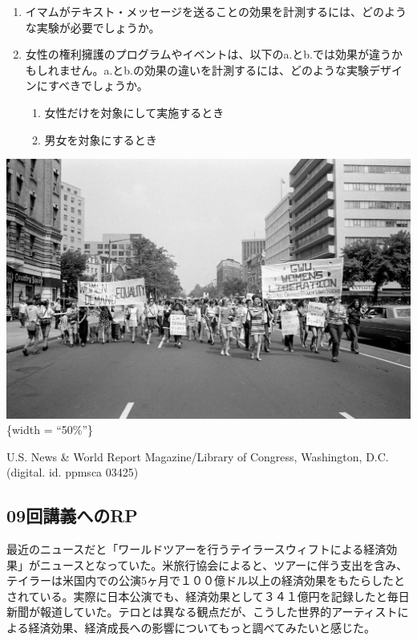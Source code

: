 \documentclass[
  letterpaper,
  DIV=11,
  numbers=noendperiod,
  oneside]{scrartcl}
\providecommand{\tightlist}{%
  \setlength{\itemsep}{0pt}\setlength{\parskip}{0pt}}\usepackage{longtable,booktabs,array}
\begin{document}
\begin{enumerate}
\def\labelenumi{\arabic{enumi}.}
\tightlist
\item
  イマムがテキスト・メッセージを送ることの効果を計測するには、どのような実験が必要でしょうか。
\item
  女性の権利擁護のプログラムやイベントは、以下のa.とb.では効果が違うかもしれません。a.とb.の効果の違いを計測するには、どのような実験デザインにすべきでしょうか。

  \begin{enumerate}
  \def\labelenumii{\alph{enumii}.}
  \tightlist
  \item
    女性だけを対象にして実施するとき
  \item
    男女を対象にするとき
  \end{enumerate}
\end{enumerate}

\includegraphics{DC1970.jpg}\{width = ``50\%''\}

U.S. News \& World Report Magazine/Library of Congress, Washington, D.C.
(digital. id. ppmsca 03425)

\subsection{09回講義へのRP}\label{ux56deux8b1bux7fa9ux3078ux306erp}

\begin{tcolorbox}[enhanced jigsaw, bottomrule=.15mm, leftrule=.75mm, arc=.35mm, toprule=.15mm, colback=white, rightrule=.15mm, breakable, left=2mm, opacityback=0, colframe=quarto-callout-note-color-frame]

最近のニュースだと「ワールドツアーを行うテイラースウィフトによる経済効果」がニュースとなっていた。米旅行協会によると、ツアーに伴う支出を含み、テイラーは米国内での公演5ヶ月で１００億ドル以上の経済効果をもたらしたとされている。実際に日本公演でも、経済効果として３４１億円を記録したと毎日新聞が報道していた。テロとは異なる観点だが、こうした世界的アーティストによる経済効果、経済成長への影響についてもっと調べてみたいと感じた。

\end{tcolorbox}
\end{document}
